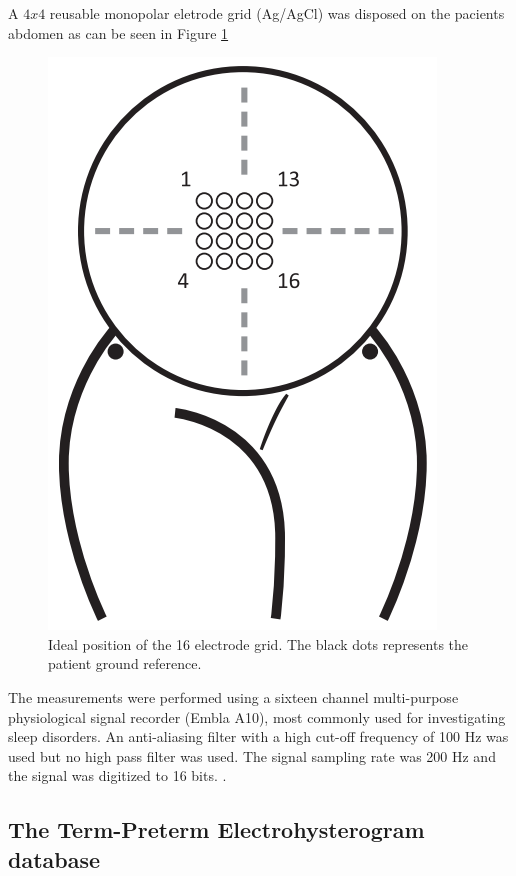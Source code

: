 \documentclass[bioengineering,article,submit,moreauthors,pdftex,10pt,a4paper]{mdpi}
\begin{document}
A $4x4$ reusable monopolar eletrode grid (Ag/AgCl) was disposed on the pacients abdomen as can be seen in Figure \ref{abd_elec} 


 \begin{figure}[H]
 	\caption{\label{abd_elec} Ideal position of the 16 electrode grid. The black dots represents the patient ground reference.}
 	\begin{center}
 		\includegraphics[scale=0.40]{imagens/abd_elec.png} 		
 	\end{center}
 \end{figure}

The measurements were performed using a sixteen channel multi-purpose physiological signal
recorder (Embla A10), most commonly used for investigating sleep disorders. An anti-aliasing filter with
a high cut-off frequency of 100 Hz was used but no high pass filter was used. The signal sampling rate was 200 Hz and the signal was digitized to 16 bits.  \cite{ref-islddatabase}.

\subsection{The Term-Preterm Electrohysterogram database}
\end{document}
